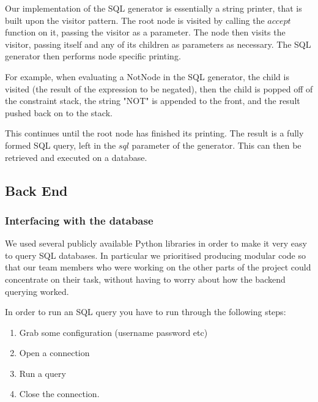 \documentclass[a4paper, 11pt]{article}
\begin{document}
        Our implementation of the SQL generator is essentially a string
        printer, that is built upon the visitor pattern. The root node is
        visited by calling the $accept$ function on it, passing the visitor as
        a parameter. The node then visits the visitor, passing itself and any
        of its children as parameters as necessary. The SQL generator then
        performs node specific printing. 

        For example, when evaluating a NotNode in the SQL generator, the child
        is visited (the result of the expression to be negated), then the child
        is popped off of the constraint stack, the string "NOT" is appended to
        the front, and the result pushed back on to the stack.

        This continues until the root node has finished its printing. The
        result is a fully formed SQL query, left in the $sql$ parameter of the
        generator. This can then be retrieved and executed on a database.

    \subsection{Back End}


    \subsubsection{Interfacing with the database}

      We used several publicly available Python libraries in order to make 
      it very easy to query SQL databases. In particular we prioritised
      producing modular code so that our team members who were working on the
      other parts of the project could concentrate on their task, without having
      to worry about how the backend querying worked.

      In order to run an SQL query you have to run through the following steps:
      
      \begin{enumerate}
        \item Grab some configuration (username password etc)
        \item Open a connection
        \item Run a query
        \item Close the connection.
      \end{enumerate}
\end{document}
